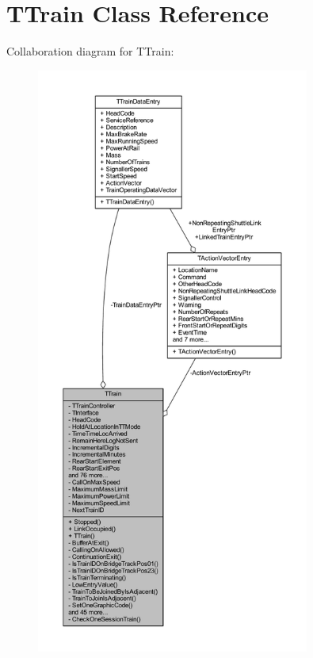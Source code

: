 \hypertarget{class_t_train}{}\section{T\+Train Class Reference}
\label{class_t_train}


Collaboration diagram for T\+Train\+:
\nopagebreak
\begin{figure}[H]
\begin{center}
\leavevmode
\includegraphics[height=550pt]{class_t_train__coll__graph}
\end{center}
\end{figure}
